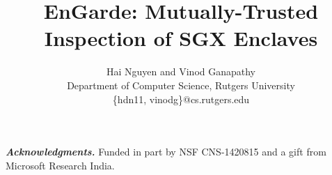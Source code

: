 \documentclass[conference,compsoc]{IEEEtran}
\newcommand{\myparagraph}[1]{\parskip -4pt \indent\par\noindent\textbf{\textit{#1}} \parskip 0pt}
\newcommand{\tool}{EnGarde\xspace} %
\begin{document}
\title{\tool: Mutually-Trusted Inspection of SGX Enclaves}
\author{Hai Nguyen and Vinod Ganapathy\\
Department of Computer Science, Rutgers University\\
\{hdn11, vinodg\}@cs.rutgers.edu}

\maketitle
\begin{abstract}
%

%
\end{abstract}










\myparagraph{Acknowledgments.} Funded in part by NSF CNS-1420815 and a 
gift from Microsoft Research India.

\scriptsize


\end{document}
